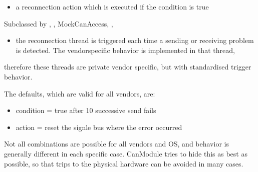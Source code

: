 \documentclass[a4paper,10pt,english]{sphinxmanual}
\begin{document}
\begin{itemize}
\item {} 
\sphinxAtStartPar
a reconnection action which is executed if the condition is true

\end{itemize}

\begin{fulllineitems}
%
\pysigstartmultiline
{}%
\pysigstopmultiline
\sphinxAtStartPar
Subclassed by {\hyperref[\detokenize{classesdetails:classAnaCanScan}]{}}, {\hyperref[\detokenize{vendors/systec:classCSockCanScan}]{}}, MockCanAccess, {\hyperref[\detokenize{vendors/peak:classPKCanScan}]{}}, {\hyperref[\detokenize{classesdetails:classSTCanScan}]{}}

\end{fulllineitems}

\begin{itemize}
\item {} 
\sphinxAtStartPar
the reconnection thread is triggered each time a sending or receiving problem is detected. The vendor\sphinxhyphen{}specific behavior is implemented in that thread,

\end{itemize}

\sphinxAtStartPar
therefore these threads are private vendor specific, but with standardised trigger behavior.

\sphinxAtStartPar
The defaults, which are valid for all vendors, are:
\begin{itemize}
\item {} 
\sphinxAtStartPar
condition = true after 10 successive send fails

\item {} 
\sphinxAtStartPar
action =  reset the signle bus where the error occurred

\end{itemize}

\sphinxAtStartPar
Not all combinations are possible for all vendors and OS, and behavior is generally
different in each specific case. CanModule tries to hide this as best as possible, so that
trips to the physical hardware can be avoided in many cases.
\end{document}

